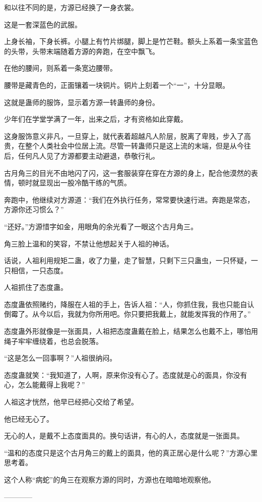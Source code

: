 \begin{this_body}
和以往不同的是，方源已经换了一身衣裳。

这是一套深蓝色的武服。

上身长袖，下身长裤。小腿上有竹片绑腿，脚上是竹芒鞋。额头上系着一条宝蓝色的头带，头带末端随着方源的奔跑，在空中飘飞。

在他的腰间，则系着一条宽边腰带。

腰带是藏青色的，正面镶着一块铜片。铜片上刻着一个“一”，十分显眼。

这就是蛊师的服饰，显示着方源一转蛊师的身份。

少年们在学堂学满了一年，出来之后，才有资格如此穿戴。

这身服饰意义非凡，一旦穿上，就代表着超越凡人阶层，脱离了卑贱，步入了高贵，在整个人类社会中位居上流。尽管一转蛊师只是这上流的末端，但是从今往后，任何凡人见了方源都要主动避退，恭敬行礼。

古月角三的目光不由地闪了闪，这一套服装穿在穿在方源的身上，配合他漠然的表情，顿时就显现出一股冷酷干练的气质。

奔跑中，他继续对方源道：“我们在外执行任务，常常要快速行进。奔跑是常态，方源你还习惯么？”

“还好。”方源惜字如金，用眼角的余光看了一眼这个古月角三。

角三脸上温和的笑容，不禁让他想起关于人祖的神话。

话说，人祖利用规矩二蛊，收了力量，走了智慧，只剩下三只蛊虫，一只怀疑，一只相信，一只态度。

人祖抓住了态度蛊。

态度蛊依照赌约，降服在人祖的手上，告诉人祖：“人，你抓住我，我也只能自认倒霉了。从今以后，我就为你所用吧。你只要把我戴上，就能发挥我的作用了。”

态度蛊外形就像是一张面具，人祖把态度蛊戴在脸上，结果怎么也戴不上，哪怕用绳子牢牢缠绕着，也总会脱落。

“这是怎么一回事啊？”人祖很纳闷。

态度蛊就笑：“我知道了，人啊，原来你没有心了。态度就是心的面具，你没有心，怎么能戴得上我呢？”

人祖这才恍然，他早已经把心交给了希望。

他已经无心了。

无心的人，是戴不上态度面具的。换句话讲，有心的人，态度就是一张面具。

“温和的态度只是这个古月角三的戴上的面具，他的真正居心是什么呢？”方源心里思考着。

这个人称“病蛇”的角三在观察方源的同时，方源也在暗暗地观察他。

------------

\end{this_body}

